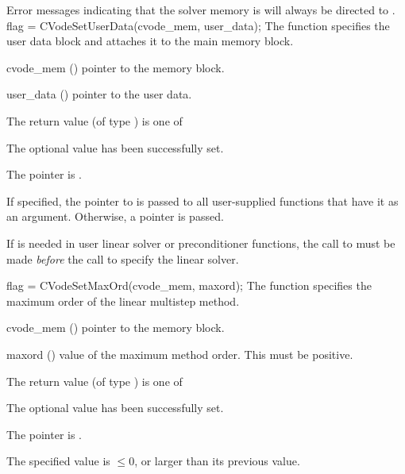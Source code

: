 {
  Error messages indicating that the {\cvodes} solver memory is  will
  always be directed to .
}
{
  flag = CVodeSetUserData(cvode\_mem, user\_data);
}
{
  The function  specifies the user data block 
  and attaches it to the main {\cvodes} memory block.
}
{
  \begin{args}
  \item[cvode\_mem] ()
    pointer to the {\cvodes} memory block.
  \item[user\_data] ()
    pointer to the user data.
  \end{args}
}
{
  The return value  (of type ) is one of
  \begin{args}
  \item[\Id{CV\_SUCCESS}]
    The optional value has been successfully set.
  \item[\Id{CV\_MEM\_NULL}]
    The  pointer is .
  \end{args}
}
{
  If specified, the pointer to  is passed to all user-supplied
  functions that have it as an argument. Otherwise, a  pointer is passed.

  {\warn}If  is needed in user linear solver or preconditioner
   functions, the call to  must be made {\it before} the
   call to specify the linear solver.
}
{
flag = CVodeSetMaxOrd(cvode\_mem, maxord);
}
{
  The function  specifies the maximum order of the
  linear multistep method.
}
{
  \begin{args}
  \item[cvode\_mem] ()
    pointer to the {\cvodes} memory block.
  \item[maxord] ()
    value of the maximum method order.  This must be positive.
  \end{args}
}
{
  The return value  (of type ) is one of
  \begin{args}
  \item[\Id{CV\_SUCCESS}]
    The optional value has been successfully set.
  \item[\Id{CV\_MEM\_NULL}]
    The  pointer is .
  \item[\Id{CV\_ILL\_INPUT}]
    The specified value  is $\leq 0$, or larger than
    its previous value.
  \end{args}
}
